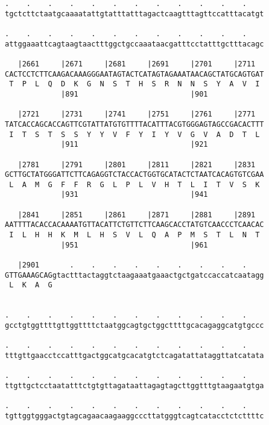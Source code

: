 \documentclass{article}
\begin{document}
\begin{Verbatim}
.    .    .    .    .    .    .    .    .    .    .    .    
tgctcttctaatgcaaaatattgtatttatttagactcaagtttagttccatttacatgt
                                                            
.    .    .    .    .    .    .    .    .    .    .    .    
attggaaattcagtaagtaactttggctgccaaataacgatttcctatttgctttacagc
                                                            
   |2661     |2671     |2681     |2691     |2701     |2711  
CACTCCTCTTCAAGACAAAGGGAATAGTACTCATAGTAGAAATAACAGCTATGCAGTGAT
 T  P  L  Q  D  K  G  N  S  T  H  S  R  N  N  S  Y  A  V  I 
             |891                          |901             
  
   |2721     |2731     |2741     |2751     |2761     |2771  
TATCACCAGCACCAGTTCGTATTATGTGTTTTACATTTACGTGGGAGTAGCCGACACTTT
 I  T  S  T  S  S  Y  Y  V  F  Y  I  Y  V  G  V  A  D  T  L 
             |911                          |921             
  
   |2781     |2791     |2801     |2811     |2821     |2831  
GCTTGCTATGGGATTCTTCAGAGGTCTACCACTGGTGCATACTCTAATCACAGTGTCGAA
 L  A  M  G  F  F  R  G  L  P  L  V  H  T  L  I  T  V  S  K 
             |931                          |941             
  
   |2841     |2851     |2861     |2871     |2881     |2891  
AATTTTACACCACAAAATGTTACATTCTGTTCTTCAAGCACCTATGTCAACCCTCAACAC
 I  L  H  H  K  M  L  H  S  V  L  Q  A  P  M  S  T  L  N  T 
             |951                          |961             
  
   |2901       .    .    .    .    .    .    .    .    .    
GTTGAAAGCAGgtactttactaggtctaagaaatgaaactgctgatccaccatcaatagg
 L  K  A  G                                                 
                                                            
  
.    .    .    .    .    .    .    .    .    .    .    .    
gcctgtggttttgttggttttctaatggcagtgctggcttttgcacagaggcatgtgccc
                                                            
.    .    .    .    .    .    .    .    .    .    .    .    
tttgttgaacctccatttgactggcatgcacatgtctcagatattataggttatcatata
                                                            
.    .    .    .    .    .    .    .    .    .    .    .    
ttgttgctcctaatatttctgtgttagataattagagtagcttggtttgtaagaatgtga
                                                            
.    .    .    .    .    .    .    .    .    .    .    .    
tgttggtgggactgtagcagaacaagaaggcccttatgggtcagtcatacctctcttttc
                                                            

\end{Verbatim}
\end{document}
